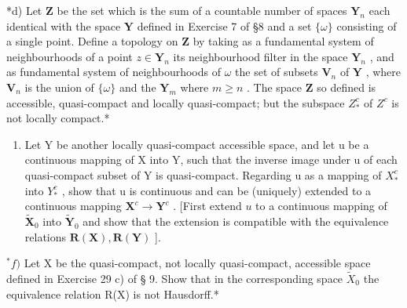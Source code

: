 *d) Let \(\mathbf{Z}\) be the set which is the sum of a countable number of spaces \(\mathbf{Y}_n\) each identical with the space \(\mathbf{Y}\) defined in Exercise 7 of §8 and a set \(\{\omega\}\) consisting of a single point. Define a topology on \(\mathbf{Z}\) by taking as a fundamental system of neighbourhoods of a point \(z \in \mathbf{Y}_n\) its neighbourhood filter in the space \(\mathbf{Y}_n\) , and as fundamental system of neighbourhoods of \(\omega\) the set of subsets \(\mathbf{V}_n\) of \(\mathbf{Y}\) , where \(\mathbf{V}_n\) is the union of \(\{\omega\}\) and the \(\mathbf{Y}_m\) where \(m \geqslant n\) . The space \(\mathbf{Z}\) so defined is accessible, quasi-compact and locally quasi-compact; but the subspace \(Z_*^c\) of \(Z^c\) is not locally compact.*

\begin{enumerate}
\def\labelenumi{\alph{enumi})}
\setcounter{enumi}{4}
\tightlist
\item
  Let Y be another locally quasi-compact accessible space, and let u be a continuous mapping of X into Y, such that the inverse image under u of each quasi-compact subset of Y is quasi-compact. Regarding u as a mapping of \(X_{*}^{c}\) into \(Y_{*}^{c}\) , show that u is continuous and can be (uniquely) extended to a continuous mapping \(\mathbf{X}^c\to \mathbf{Y}^c\) . {[}First extend \(u\) to a continuous mapping of \(\tilde{\mathbf{X}}_0\) into \(\tilde{\mathbf{Y}}_0\) and show that the extension is compatible with the equivalence relations \(\mathbf{R}(\mathbf{X}),\mathbf{R}(\mathbf{Y})\) {]}.
\end{enumerate}

\(^{*}f)\) Let X be the quasi-compact, not locally quasi-compact, accessible space defined in Exercise 29 c) of § 9. Show that in the corresponding space \(\tilde{X}_{0}\) the equivalence relation R(X) is not Hausdorff.*

